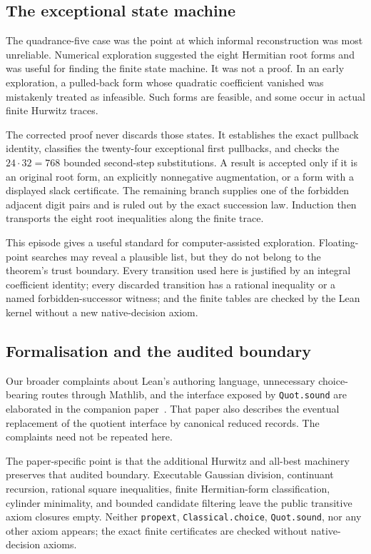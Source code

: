 \documentclass[11pt]{article}
\begin{document}
\subsection{The exceptional state machine}

The quadrance-five case was the point at which informal reconstruction was
most unreliable.  Numerical exploration suggested the eight Hermitian root
forms and was useful for finding the finite state machine.  It was not a
proof.  In an early exploration, a pulled-back form whose quadratic
coefficient vanished was mistakenly treated as infeasible.  Such forms are
feasible, and some occur in actual finite Hurwitz traces.

The corrected proof never discards those states.  It establishes the exact
pullback identity, classifies the twenty-four exceptional first pullbacks,
and checks the $24\cdot32=768$ bounded second-step substitutions.  A result is
accepted only if it is an original root form, an explicitly nonnegative
augmentation, or a form with a displayed slack certificate.  The remaining
branch supplies one of the forbidden adjacent digit pairs and is ruled out
by the exact succession law.  Induction then transports the eight root
inequalities along the finite trace.

This episode gives a useful standard for computer-assisted exploration.
Floating-point searches may reveal a plausible list, but they do not belong
to the theorem's trust boundary.  Every transition used here is justified by
an integral coefficient identity; every discarded transition has a rational
inequality or a named forbidden-successor witness; and the finite tables are
checked by the Lean kernel without a new native-decision axiom.

\subsection{Formalisation and the audited boundary}

Our broader complaints about Lean's authoring language, unnecessary
choice-bearing routes through Mathlib, and the interface exposed by
\texttt{Quot.sound} are elaborated in the companion paper~\cite{RFAPOne}.
That paper also describes the eventual replacement of the quotient interface
by canonical reduced records.  The complaints need not be repeated here.

The paper-specific point is that the additional Hurwitz and all-best
machinery preserves that audited boundary.  Executable Gaussian division,
continuant recursion, rational square inequalities, finite Hermitian-form
classification, cylinder minimality, and bounded candidate filtering leave
the public transitive axiom closures empty.  Neither \texttt{propext},
\texttt{Classical.choice}, \texttt{Quot.sound}, nor any other axiom appears;
the exact finite certificates are checked without native-decision axioms.
\end{document}
